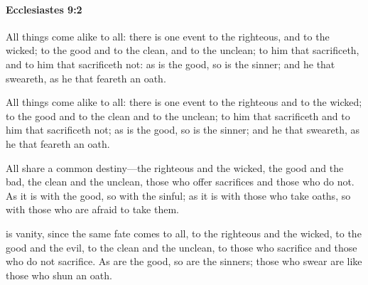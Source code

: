 		\paragraph{Ecclesiastes 9:2} %
			\label{ECCLESIASTES-9-2}

			All things come alike to all: there is one event to the righteous, and to the wicked; to the good and to the clean, and to the unclean; to him that sacrificeth, and to him that sacrificeth not: as is the good, so is the sinner; and he that sweareth, as he that feareth an oath.

			\begin{versebox}
					\item[BHS] 
					\item[LXX] 
					\item[ASV] All things come alike to all: there is one event to the righteous and to the wicked; to the good and to the clean and to the unclean; to him that sacrificeth and to him that sacrificeth not; as is the good, so is the sinner; and he that sweareth, as he that feareth an oath.
					\item[NIV] All share a common destiny—the righteous and the wicked, the good and the bad, the clean and the unclean, those who offer sacrifices and those who do not. As it is with the good, so with the sinful; as it is with those who take oaths, so with those who are afraid to take them.
					\item[NRSV] is vanity, since the same fate comes to all, to the righteous and the wicked, to the good and the evil, to the clean and the unclean, to those who sacrifice and those who do not sacrifice. As are the good, so are the sinners; those who swear are like those who shun an oath.
			\end{versebox}

